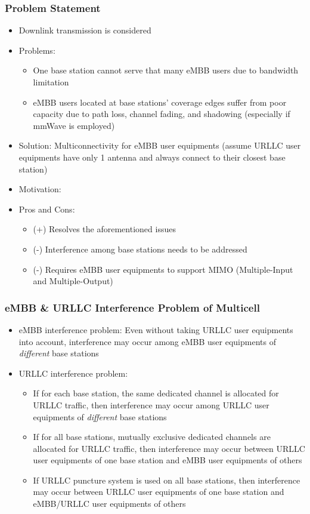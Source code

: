 \documentclass{beamer}
\begin{document}
\begin{frame}
  \frametitle{Problem Statement}
  \begin{itemize}
    \item Downlink transmission is considered
    \item Problems:
      \begin{itemize}
        \item One base station cannot serve that many eMBB users due to bandwidth limitation
        \item eMBB users located at base stations' coverage edges suffer from poor capacity due to path loss, channel fading, and shadowing (especially if mmWave is employed)
      \end{itemize}
    \item Solution: Multiconnectivity for eMBB user equipments (assume URLLC user equipments have only 1 antenna and always connect to their closest base station)
    \item Motivation:
    \item Pros and Cons:
      \begin{itemize}
        \item (+) Resolves the aforementioned issues
        \item (-) Interference among base stations needs to be addressed
        \item (-) Requires eMBB user equipments to support MIMO (Multiple-Input and Multiple-Output)
      \end{itemize}
  \end{itemize}
\end{frame}

\begin{frame}
  \frametitle{eMBB \& URLLC Interference Problem of Multicell}
  \begin{itemize}
    \item eMBB interference problem: Even without taking URLLC user equipments into account, interference may occur among eMBB user equipments of \emph{different} base stations
    \item URLLC interference problem:
      \begin{itemize}
        \item If for each base station, the same dedicated channel is allocated for URLLC traffic, then interference may occur among URLLC user equipments of \emph{different} base stations
        \item If for all base stations, mutually exclusive dedicated channels are allocated for URLLC traffic, then interference may occur between URLLC user equipments of one base station and eMBB user equipments of others
        \item If URLLC puncture system is used on all base stations, then interference may occur between URLLC user equipments of one base station and eMBB/URLLC user equipments of others
      \end{itemize}
  \end{itemize}
\end{frame}
\end{document}
